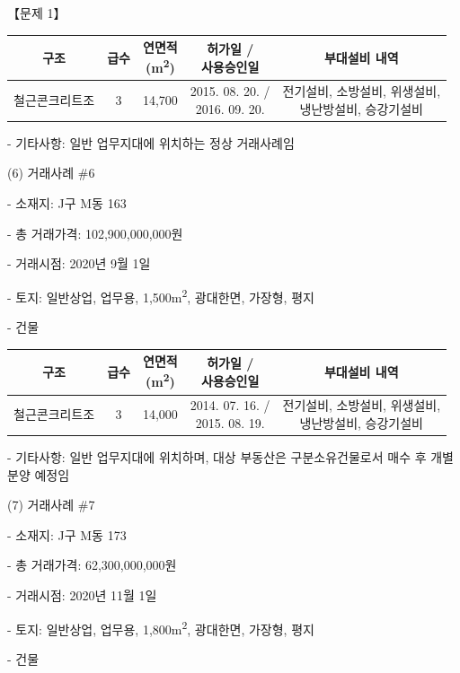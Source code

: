 \begin{longquestion}{【문제 1】}
{\small\centering
\begin{tabular}{|c|c|c|c|c|}\hline
구조 & 급수 & \makecell{연면적\\(m\textsuperscript{2})} & \makecell{허가일 /\\사용승인일} & 부대설비 내역 \\\hline
철근콘크리트조 & 3 & 14,700 & \makecell{2015. 08. 20. /\\2016. 09. 20.} & \makecell{전기설비, 소방설비, 위생설비,\\냉난방설비, 승강기설비} \\\hline
\end{tabular}\par}
- 기타사항: 일반 업무지대에 위치하는 정상 거래사례임 \par
(6) 거래사례 \#6 \par
- 소재지: J구 M동 163 \par
- 총 거래가격: 102,900,000,000원 \par
- 거래시점: 2020년 9월 1일 \par
- 토지: 일반상업, 업무용, 1,500m\textsuperscript{2}, 광대한면, 가장형, 평지 \par
- 건물 \par
{\small\centering
\begin{tabular}{|c|c|c|c|c|}\hline
구조 & 급수 & \makecell{연면적\\(m\textsuperscript{2})} & \makecell{허가일 /\\사용승인일} & 부대설비 내역 \\\hline
철근콘크리트조 & 3 & 14,000 & \makecell{2014. 07. 16. /\\2015. 08. 19.} & \makecell{전기설비, 소방설비, 위생설비,\\냉난방설비, 승강기설비} \\\hline
\end{tabular}\par}
- 기타사항: 일반 업무지대에 위치하며, 대상 부동산은 구분소유건물로서 매수 후 개별분양 예정임 \par
(7) 거래사례 \#7 \par
- 소재지: J구 M동 173 \par
- 총 거래가격: 62,300,000,000원 \par
- 거래시점: 2020년 11월 1일 \par
- 토지: 일반상업, 업무용, 1,800m\textsuperscript{2}, 광대한면, 가장형, 평지 \par
- 건물 \par
{\small\centering
\begin{tabular}{|c|c|c|c|c|}\hline

\end{tabular}}
\end{longquestion}
